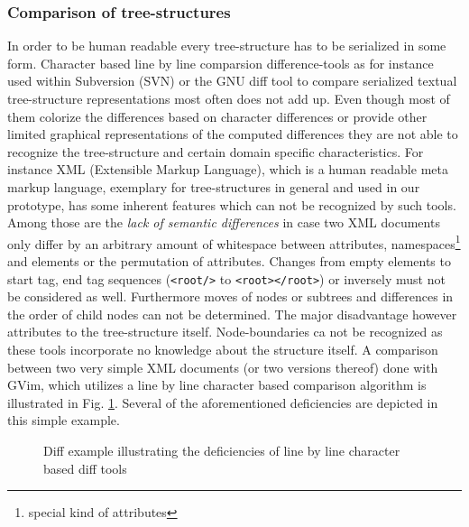 \subsubsection{Comparison of tree-structures}
In order to be human readable every tree-structure has to be serialized in some form. Character based line by line comparsion difference-tools as for instance used within Subversion (SVN) or the GNU diff tool to compare serialized textual tree-structure representations most often %
does not add up. Even though most of them colorize the differences based on character differences or provide other limited graphical representations of the computed differences they are not able to recognize the tree-structure and certain domain specific characteristics. For instance XML (Extensible Markup Language), which is a human readable meta markup language, exemplary for tree-structures in general and used in our prototype, has some inherent features which can not be recognized by such tools. Among those are the \emph{lack of semantic differences} in case two XML documents only differ by an arbitrary amount of whitespace between attributes, namespaces\footnote{special kind of attributes} and elements or the permutation of attributes. Changes from empty elements to start tag, end tag sequences (\texttt{<root/>} to \texttt{<root></root>}) or inversely must not be considered as well. Furthermore moves of nodes or subtrees and differences in the order of child nodes can not be determined. The major disadvantage however attributes to the tree-structure itself. Node-boundaries ca not be recognized as these tools incorporate no knowledge about the structure itself. A comparison between two very simple XML documents (or two versions thereof) done with GVim, which utilizes a line by line character based comparison algorithm is illustrated in Fig. \ref{fig:faileddiff}. Several of the aforementioned deficiencies are depicted in this simple example. 

\begin{figure}[tb]
\caption{\label{fig:faileddiff} Diff example illustrating the deficiencies of line by line character based diff tools}
\end{figure}

